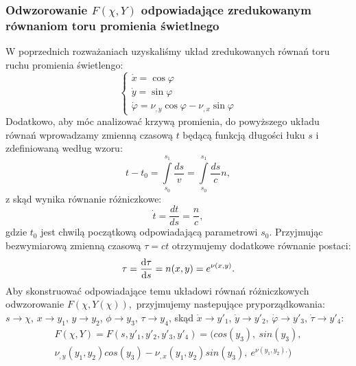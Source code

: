 \subsubsection{Odwzorowanie $F(\chi,Y)$ odpowiadające zredukowanym równaniom toru promienia świetlnego}
W poprzednich rozważaniach uzyskaliśmy układ zredukowanych równań toru ruchu promienia świetlengo:
$$
\left\{\begin{array}{l}
  \dot{x}=\cos{\varphi} \\ 
  \dot{y}=\sin{\varphi} \\
  \dot{\varphi}=\nu_{,y}\cos{\varphi}-\nu_{,x}\sin{\varphi}
\end{array}\right.
$$
Dodatkowo, aby móc analizować krzywą promienia, do powyższego układu równań wprowadzamy zmienną czasową $t$ będącą funkcją długości łuku $s$ i zdefiniowaną według wzoru:
$$t-t_0=\int\limits_{s_0}^{s_1}\!\! \frac{ds}{v}=\int\limits_{s_0}^{s_1}\!\! \frac{ds}{c}n,$$
z skąd wynika równanie różniczkowe:
$$\dot{t}=\frac{dt}{ds}=\frac{n}{c},$$
gdzie $t_0$ jest chwilą początkową odpowiadającą parametrowi $s_0$.
Przyjmując bezwymiarową zmienną czasową $\tau=c t$ otrzymujemy dodatkowe równanie postaci:
$$\tau=\frac{{\rm d}{\tau}}{{\rm d}{s}}=n(x,y)=e^{\nu(x,y)}.$$
Aby skonstruować odpowiadające temu układowi równań różniczkowych odwzorowanie $F(\chi,Y(\chi))$,~przyjmujemy nastepujące pryporządkowania: $s\to \chi$, $x \to y_1$, $y \to y_2$, $\phi \to y_3$, $\tau \to y_4$, skąd $\dot{x} \to y'_1$, $\dot{y} \to y'_2$, $\dot{\varphi} \to y'_3$,  $\dot{\tau} \to y'_4$:\\
$$\begin{matrix}
F(\chi,Y)=F(s,y'_1,y'_2,y'_3,y'_4)=(cos(y_3),~sin(y_3),\\ 
\nu_{,y}(y_1,y_2)cos(y_3)-\nu_{,x}(y_1,y_2)sin(y_3),~e^{\nu(y_1,y_2).})
\end{matrix}$$
